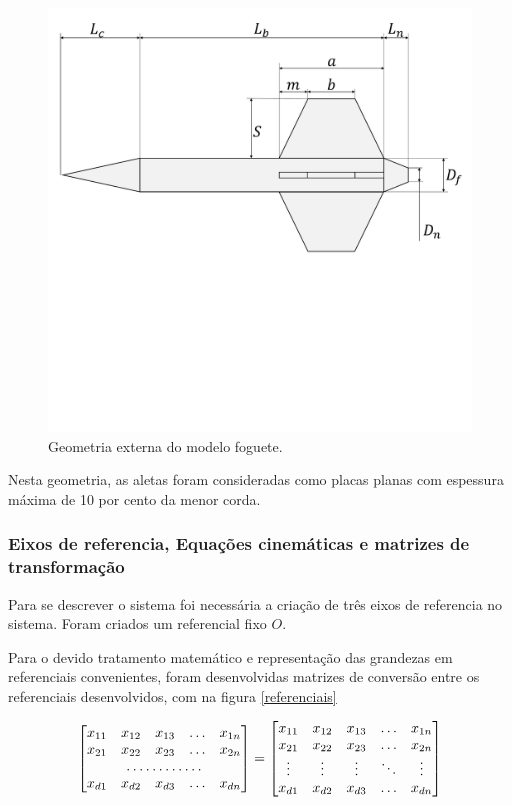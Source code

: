 \documentclass[10pt,fleqn,a4paper,twoside]{article}
\begin{document}
\begin{figure}[h!]
	\centering
	\includegraphics[trim = {0cm 13cm 0cm 0cm}, clip , angle=0, scale=0.30]{imagens/foguete_statera}
	\caption{Geometria externa do modelo foguete.}
	\label{geometria_foguete}
\end{figure}
Nesta geometria, as aletas foram consideradas como placas planas com espessura máxima de 10 por cento da menor corda.



\subsubsection{Eixos de referencia, Equações cinemáticas e matrizes de transformação}
Para se descrever o sistema foi necessária a criação de três eixos de referencia no sistema. Foram criados um referencial fixo $ O $.

Para o devido tratamento matemático e representação das grandezas em referenciais convenientes, foram desenvolvidas matrizes de conversão entre os referenciais desenvolvidos, com na figura \ref{referenciais}

\begin{equation}
\begin{bmatrix}
x_{11}       & x_{12} & x_{13} & \dots & x_{1n} \\
x_{21}       & x_{22} & x_{23} & \dots & x_{2n} \\
\hdotsfor{5} \\
x_{d1}       & x_{d2} & x_{d3} & \dots & x_{dn}
\end{bmatrix}
=
\begin{bmatrix}
x_{11} & x_{12} & x_{13} & \dots  & x_{1n} \\
x_{21} & x_{22} & x_{23} & \dots  & x_{2n} \\
\vdots & \vdots & \vdots & \ddots & \vdots \\
x_{d1} & x_{d2} & x_{d3} & \dots  & x_{dn}
\end{bmatrix}
\end{equation}
\end{document}
